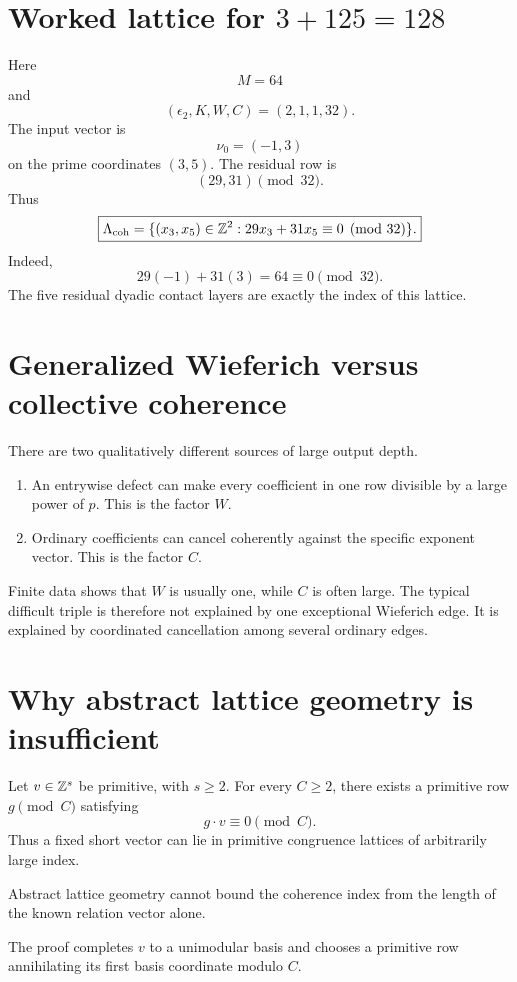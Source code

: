 \section{Worked lattice for \texorpdfstring{$3+125=128$}{3+125=128}}
Here
\[
 M=64
\]
and
\[
 (\epsilon_2,K,W,C)=(2,1,1,32).
\]
The input vector is
\[
 \nu_0=(-1,3)
\]
on the prime coordinates $(3,5)$. The residual row is
\[
 (29,31)\pmod{32}.
\]
Thus
\[
 \boxed{
 \Lambda_{\mathrm{coh}}
 =
 \{(x_3,x_5)\in\mathbb Z^2:29x_3+31x_5\equiv0\pmod{32}\}.
 }
\]
Indeed,
\[
 29(-1)+31(3)=64\equiv0\pmod{32}.
\]
The five residual dyadic contact layers are exactly the index of this lattice.

\section{Generalized Wieferich versus collective coherence}
There are two qualitatively different sources of large output depth.

\begin{enumerate}[leftmargin=1.5em]
\item An entrywise defect can make every coefficient in one row divisible by a large power of $p$. This is the factor $W$.
\item Ordinary coefficients can cancel coherently against the specific exponent vector. This is the factor $C$.
\end{enumerate}

Finite data shows that $W$ is usually one, while $C$ is often large. The typical difficult triple is therefore not explained by one exceptional Wieferich edge. It is explained by coordinated cancellation among several ordinary edges.

\section{Why abstract lattice geometry is insufficient}
Let $v\in\mathbb Z^s$ be primitive, with $s\ge2$. For every $C\ge2$, there exists a primitive row $g\pmod C$ satisfying
\[
 g\cdot v\equiv0\pmod C.
\]
Thus a fixed short vector can lie in primitive congruence lattices of arbitrarily large index.

\begin{theorem}
Abstract lattice geometry cannot bound the coherence index from the length of the known relation vector alone.
\end{theorem}

The proof completes $v$ to a unimodular basis and chooses a primitive row annihilating its first basis coordinate modulo $C$.

